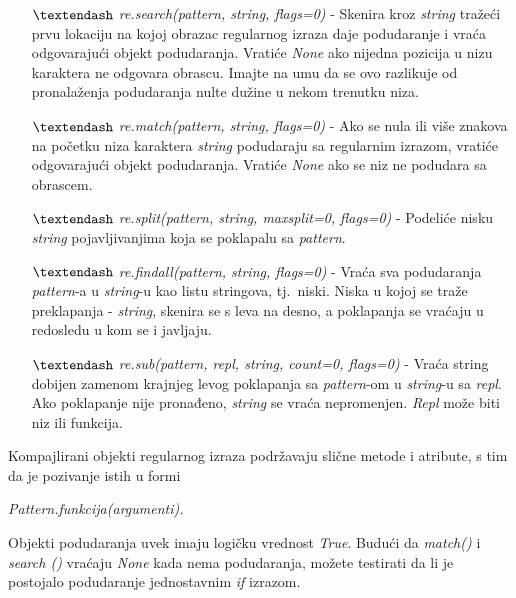 \documentclass[12pt,oneside]{memoir}
\theoremstyle{plain}
\theoremstyle{definition}
\begin{document}
\begin{itemize}
\item[$\textendash$]  \textit{re.search(pattern, string, flags=0)} - Skenira kroz \textit{string} tražeći prvu lokaciju na kojoj obrazac regularnog izraza daje podudaranje i vraća odgovarajući objekt podudaranja. Vratiće \textit{None} ako nijedna pozicija u nizu karaktera ne odgovara obrascu. Imajte na umu da se ovo razlikuje od pronalaženja podudaranja nulte dužine u nekom trenutku niza.
\item[$\textendash$]  \textit{re.match(pattern, string, flags=0)} - Ako se nula ili više znakova na početku niza karaktera \textit{string}  podudaraju sa regularnim izrazom, vratiće odgovarajući objekt podudaranja. Vratiće \textit{None} ako se niz ne podudara sa obrascem.
\item[$\textendash$]  \textit{re.split(pattern, string, maxsplit=0, flags=0)} - Podeliće nisku \textit{string} pojavljivanjima koja se poklapalu sa \textit{pattern}. 
\item[$\textendash$]  \textit{re.findall(pattern, string, flags=0)} - Vraća sva podudaranja \textit{pattern}-a u \textit{string}-u kao listu stringova, tj.~niski. Niska u kojoj se traže preklapanja - \textit{string}, skenira se s leva na desno, a poklapanja se vraćaju u redosledu u kom se i javljaju. 
\item[$\textendash$]  \textit{re.sub(pattern, repl, string, count=0, flags=0)} - Vraća string dobijen zamenom krajnjeg levog poklapanja sa \textit{pattern}-om u \textit{string}-u sa \textit{repl}. Ako poklapanje nije pronađeno, \textit{string} se vraća nepromenjen. \textit{Repl} može biti niz ili funkcija.
\end{itemize}

Kompajlirani objekti regularnog izraza podržavaju slične metode i atribute, s tim da je pozivanje istih u formi
\begin{center}
\textit{Pattern.funkcija(argumenti).}
\end{center}

Objekti podudaranja uvek imaju logičku vrednost \textit{True}. Budući da \textit{match()} i \textit{search ()} vraćaju \textit{None} kada nema podudaranja, možete testirati da li je postojalo podudaranje jednostavnim \textit{if} izrazom. 
\end{document}
